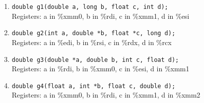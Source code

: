 \documentclass{article}
\begin{document}
\begin{enumerate}[label=\textbf{\Alph*.}]
	\item \texttt{double g1(double a, long b, float c, int d);} \\
	Registers: a in \%xmm0, b in \%rdi, c in \%xmm1, d in \%esi
	\item \texttt{double g2(int a, double *b, float *c, long d);} \\
	Registers: a in \%edi, b in \%rsi, c in \%rdx, d in \%rcx
	\item \texttt{double g3(double *a, double b, int c, float d);} \\
	Registers: a in \%rdi, b in \%xmm0, c in \%esi, d in \%xmm1
	\item \texttt{double g4(float a, int *b, float c, double d);} \\
	Registers: a in \%xmm0, b in \%rdi, c in \%xmm1, d in \%xmm2
\end{enumerate}
\end{document}
